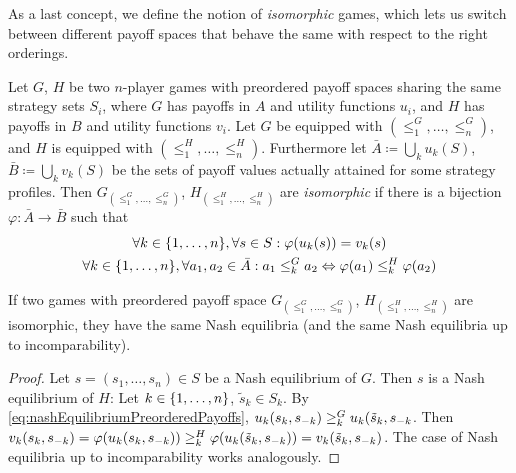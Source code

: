\documentclass[a4paper]{scrreprt}
\let\phi\varphi
\begin{document}
    As a last concept, we define the notion of \emph{isomorphic} games, which lets us switch between different payoff spaces that behave the same with respect to the right orderings.
    \begin{defn}
        Let $G$, $H$ be two $n$-player games with preordered payoff spaces sharing the same strategy sets $S_i$, where $G$ has payoffs in $A$ and utility functions $u_i$,
        and $H$ has payoffs in $B$ and utility functions $v_i$.
        Let $G$ be equipped with $(\leq_1^G, \dots, \leq_n^G)$, and $H$ is equipped with $(\leq_1^H, \dots, \leq_n^H)$.
        Furthermore let $\bar{A} \coloneqq \bigcup_k u_k(S)$, $\bar{B} \coloneqq \bigcup_k v_k(S)$ be the sets of payoff values actually attained for some strategy profiles.
        Then $G_{(\leq_1^G, \dots, \leq_n^G)}$, $H_(\leq_1^H, \dots, \leq_n^H)$
        are \emph{isomorphic} if there is a bijection $\phi: \bar{A} \to \bar{B}$ such that
        \begin{gather}
            \forall k \in \set{1, \dots, n}, \forall s \in S: \phi(u_k(s)) = v_k(s) \\
            \forall k \in \set{1, \dots, n}, \forall a_1, a_2 \in \bar{A}: a_1 \leq_k^G a_2 \lra \phi(a_1) \leq_k^H \phi(a_2)
        \end{gather}
    \end{defn}
    
    \begin{lemma}
        If two games with preordered payoff space $G_{(\leq_1^G, \dots, \leq_n^G)}$, $H_{(\leq_1^H, \dots, \leq_n^H)}$ are isomorphic,
        they have the same Nash equilibria (and the same Nash equilibria up to incomparability).
    \end{lemma}
    \begin{proof}
        Let $s = (s_1, \dots, s_n) \in S$ be a Nash equilibrium of $G$.
        Then $s$ is a Nash equilibrium of $H$: Let $k \in \{1, \dots, n\}$, $\tilde{s}_k \in S_k$.
        By \eqref{eq:nashEquilibriumPreorderedPayoffs}, $u_k(s_k, s_{-k}) \geq_k^G u_k(\tilde{s}_k, s_{-k}$.
        Then $v_k(s_k, s_{-k}) = \phi(u_k(s_k, s_{-k})) \popref_k^H \phi(u_k(\tilde{s}_k, s_{-k})) = v_k(\tilde{s}_k, s_{-k})$.
        The case of Nash equilibria up to incomparability works analogously.
    \end{proof}
    
\end{document}
